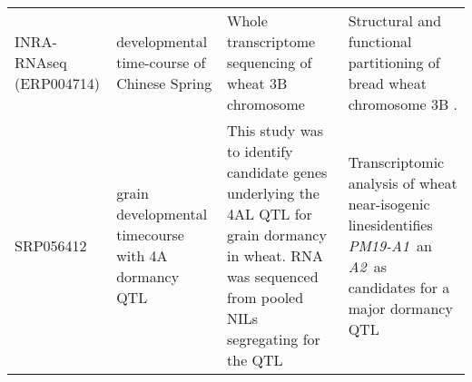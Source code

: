 \begin{sidewaystable}
\begin{tabular}{p{2cm}p{3cm}p{7.4cm}p{10.1cm}}
  INRA-RNAseq (ERP004714) & developmental time-course of Chinese Spring & Whole transcriptome sequencing of wheat 3B chromosome  & Structural and functional partitioning of bread wheat chromosome 3B \citep{Choulet2014}. \\
 SRP056412 & grain developmental timecourse with 4A dormancy QTL & This study was to identify candidate genes underlying the 4AL QTL for grain dormancy in wheat. RNA was sequenced from pooled NILs segregating for the QTL & Transcriptomic analysis of wheat near-isogenic linesidentifies  \textit{PM19-A1} an \textit{A2} as candidates for a major dormancy QTL \citep{Barrero2015} \\
\bottomrule
\end{tabular}
\end{sidewaystable}
